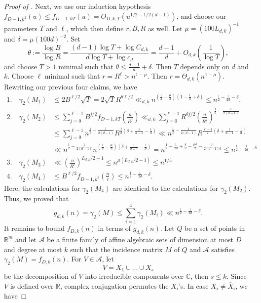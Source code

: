 \documentclass[11pt]{article}
\theoremstyle{plain}
\theoremstyle{definition}
\begin{document}
\begin{proof}[Proof of ]
		Next, we use our induction hypothesis $f_{D-1,k^2}(u)\leq f_{D-1,kT}(u)= O_{D,k,T}(u^{1/2-1/2(d-1)})$, and choose our parameters $T$ and $\ell$, which then define $r,B,R$ as well. Let $\mu=(100L_{d,k})^{-1}$ and $\delta=\mu(100d)^{-2}$. Set
		$$\theta:=\frac{\log B}{\log R}=\frac{(d-1)\log T+\log C_{d,k}}{d\log T+\log c_{d}}=\frac{d-1}{d}+O_{d,k}\left(\frac{1}{\log T}\right),$$
		and choose $T>1$ minimal such that $\theta\leq \frac{d-1}{d}+\delta$. Then $T$ depends only on $d$ and $k$. Choose $\ell$ minimal such that $r=R^{\ell}>n^{1-\mu}$. Then $r=\Theta_{d,k}(n^{1-\mu})$. Rewriting our previous four claims, we have 
		\begin{align*}
			1.\quad \gamma_2(M_1)&\leq 2 B^{\ell/2}\sqrt{T}=2\sqrt{T} R^{\theta \ell/2}\ll_{d,k} n^{(\frac{1}{2}-\frac{\mu}{2})(1-\frac{1}{d}+\delta)}\leq n^{\frac{1}{2}-\frac{1}{2d}-\delta},\\
			2.\quad\gamma_2(M_2)&\leq \sum_{j=0}^{\ell-1}B^{j/2}f_{D-1,kT}\left(\frac{n}{R^j}\right)\ll_{d,k} \sum_{j=0}^{\ell-1} R^{\theta j/2} \left(\frac{n}{R^j}\right)^{\frac{1}{2}-\frac{1}{2(d-1)}}\\
			&\leq \sum_{j=0}^{\ell-1} n^{\frac{1}{2}-\frac{1}{2(d-1)}} R^{\frac{j}{2}(\delta+\frac{1}{d-1}-\frac{1}{d})}\ll n^{\frac{1}{2}-\frac{1}{2(d-1)}} R^{\frac{\ell-1}{2}(\delta+\frac{1}{d-1}-\frac{1}{d})}\\
			&\ll n^{\frac{1}{2}-\frac{1}{2(d-1)}} n^{(\frac{1}{2}-\frac{\mu}{2})(\delta+\frac{1}{d-1}-\frac{1}{d})}=n^{\frac{1}{2}-\frac{1}{2d}+\frac{\delta}{2}-\frac{\mu\delta}{2}-\frac{\mu}{2(d-1)d}}\leq n^{\frac{1}{2}-\frac{1}{2d}-\delta}\\
			3.\quad\gamma_2(M_3)&\ll \left(\frac{n}{R^{\ell}}\right)^{L_{d,k}/2-1}\leq n^{\mu (L_{d,k}/2-1)}\leq n^{1/5}\\
			4.\quad\gamma_2(M_4)&\leq B^{\ell/2}f_{D-1,k^2}\left(\frac{n}{r}\right)\leq n^{\frac{1}{2}-\frac{1}{2d}-\delta}.
		\end{align*}
		Here, the calculations for $\gamma_2(M_4)$ are identical to the calculations for $\gamma_2(M_2)$. Thus, we proved that
		$$g_{d,k}(n)=\gamma_2(M)\leq \sum_{i=1}^{4}\gamma_2(M_i)\ll  n^{\frac{1}{2}-\frac{1}{2d}-\delta}.$$
		It remains to bound $f_{D,k}(n)$ in terms of $g_{d,k}(n)$. Let $Q$ be a set of points in $\mathbb{R}^m$ and let $\mathcal{A}$ be a finite family of affine algebraic sets of dimension at most $D$ and degree at most $k$ such that the incidence matrix $M$ of $Q$ and  $\mathcal{A}$ satisfies $\gamma_2(M)=f_{D,k}(n)$. For $V\in \mathcal{A}$, let
		$$V=X_1\cup\dots\cup X_s$$
		be the decomposition of $V$ into irreducible components over $\mathbb{C}$, then $s\leq k$. Since $V$ is defined over $\mathbb{R}$, complex conjugation permutes the $X_i$'s. In case $X_i\neq \overline{X}_i$, we have

\end{proof}
\end{document}
